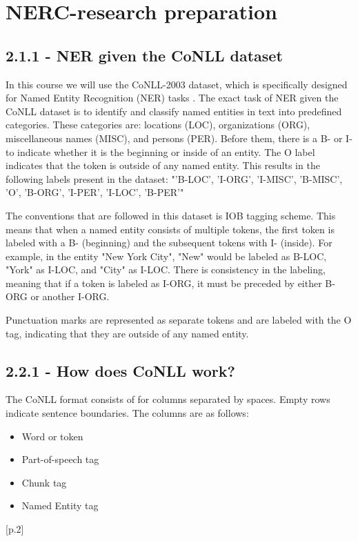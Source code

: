 \documentclass[11pt]{article}
\begin{document}
\appendix



\clearpage

\section*{NERC-research preparation}
\subsection*{2.1.1 - NER given the CoNLL dataset}
In this course we will use the CoNLL-2003 dataset, which is specifically designed for Named Entity Recognition (NER) tasks \cite{sang2003introductionconll2003sharedtask}.
The exact task of NER given the CoNLL dataset is to identify and classify named entities in text into predefined categories.
These categories are: locations (LOC), organizations (ORG), miscellaneous names (MISC), and persons (PER).
Before them, there is a B- or I- to indicate whether it is the beginning or inside of an entity.
The O label indicates that the token is outside of any named entity.
This results in the following labels present in the dataset:
"{'B-LOC', 'I-ORG', 'I-MISC', 'B-MISC', 'O', 'B-ORG', 'I-PER', 'I-LOC', 'B-PER'}"

The conventions that are followed in this dataset is IOB tagging scheme.
This means that when a named entity consists of multiple tokens, the first token is labeled with a B- (beginning) and the subsequent tokens with I- (inside).
For example, in the entity "New York City", "New" would be labeled as B-LOC, "York" as I-LOC, and "City" as I-LOC.
There is consistency in the labeling, meaning that if a token is labeled as I-ORG, it must be preceded by either B-ORG or another I-ORG.

Punctuation marks are represented as separate tokens and are labeled with the O tag, indicating that they are outside of any named entity.
\subsection*{2.2.1 - How does CoNLL work?}
The CoNLL format consists of for columns separated by spaces.
Empty rows indicate sentence boundaries.
The columns are as follows:
\begin{itemize}
    \item Word or token
    \item Part-of-speech tag
    \item Chunk tag
    \item Named Entity tag
\end{itemize} \cite{sang2003introductionconll2003sharedtask}[p.2]
\end{document}

